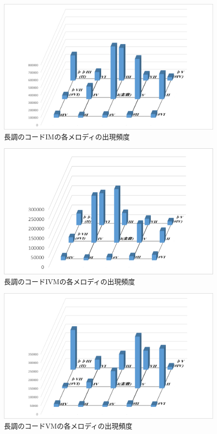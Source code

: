 \begin{figure}[t]
	\begin{center}
		\includegraphics[width=0.8\linewidth]{./pics/05/MajorIM.png}
		\caption{長調のコードIMの各メロディの出現頻度}
		\label{img:MIM} 
	\end{center}
\end{figure}
\begin{figure}[t]
	\begin{center}
		\includegraphics[width=0.8\linewidth]{./pics/05/MajorIVM.png}
		\caption{長調のコードIVMの各メロディの出現頻度}
		\label{img:MIVM} 
	\end{center}
\end{figure}
\begin{figure}[t]
	\begin{center}
		\includegraphics[width=0.8\linewidth]{./pics/05/MajorVM.png}
		\caption{長調のコードVMの各メロディの出現頻度}
		\label{img:MVM} 
	\end{center}
\end{figure}
